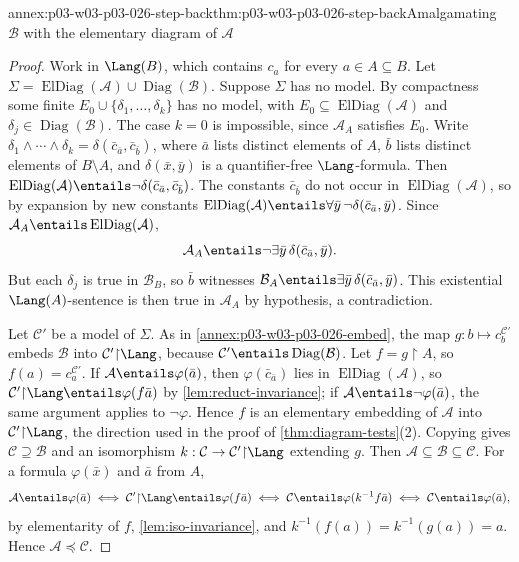 \begin{annexitem}{annex:p03-w03-p03-026-step-back}{thm:p03-w03-p03-026-step-back}{Amalgamating \(\mathcal B\) with the elementary diagram of \(\mathcal A\)}
\begin{proof}
Work in \(\Lang(B)\), which contains \(c_a\) for every \(a\in A\subseteq B\).
Let \(\Sigma=\operatorname{ElDiag}(\mathcal A)\cup\operatorname{Diag}(\mathcal B)\).
Suppose \(\Sigma\) has no model.  By compactness some finite
\(E_0\cup\{\delta_1,\ldots,\delta_k\}\) has no model, with
\(E_0\subseteq\operatorname{ElDiag}(\mathcal A)\) and
\(\delta_j\in\operatorname{Diag}(\mathcal B)\). The case \(k=0\) is
impossible, since \(\mathcal A_A\) satisfies \(E_0\). Write
\(\delta_1\land\cdots\land\delta_k=\delta(\bar c_{\bar a},\bar c_{\bar b})\),
where \(\bar a\) lists distinct elements of \(A\), \(\bar b\) lists distinct
elements of \(B\setminus A\), and \(\delta(\bar x,\bar y)\) is a
quantifier-free \(\Lang\)-formula.
Then \(\operatorname{ElDiag}(\mathcal A)\entails
\neg\delta(\bar c_{\bar a},\bar c_{\bar b})\).  The constants
\(\bar c_{\bar b}\) do not occur in \(\operatorname{ElDiag}(\mathcal A)\), so
by expansion by new constants
\(\operatorname{ElDiag}(\mathcal A)\entails
\forall\bar y\,\neg\delta(\bar c_{\bar a},\bar y)\).  Since
\(\mathcal A_A\entails\operatorname{ElDiag}(\mathcal A)\),
\[
 \mathcal A_A\entails\neg\exists\bar y\,\delta(\bar c_{\bar a},\bar y).
\]
But each \(\delta_j\) is true in \(\mathcal B_B\), so \(\bar b\) witnesses
\(\mathcal B_A\entails\exists\bar y\,\delta(\bar c_{\bar a},\bar y)\).  This
existential \(\Lang(A)\)-sentence is then true in \(\mathcal A_A\) by
hypothesis, a contradiction.

Let \(\mathcal C'\) be a model of \(\Sigma\).  As in \cref{annex:p03-w03-p03-026-embed}, the map
\(g:b\mapsto c_b^{\mathcal C'}\) embeds \(\mathcal B\) into
\(\mathcal C'{\restriction}\Lang\), because
\(\mathcal C'\entails\operatorname{Diag}(\mathcal B)\).  Let
\(f=g{\restriction}A\), so \(f(a)=c_a^{\mathcal C'}\).  If
\(\mathcal A\entails\varphi(\bar a)\), then \(\varphi(\bar c_{\bar a})\) lies
in \(\operatorname{ElDiag}(\mathcal A)\), so
\(\mathcal C'{\restriction}\Lang\entails\varphi(f\bar a)\) by
\cref{lem:reduct-invariance}; if \(\mathcal A\entails\neg\varphi(\bar a)\),
the same argument applies to \(\neg\varphi\).  Hence \(f\) is an elementary
embedding of \(\mathcal A\) into \(\mathcal C'{\restriction}\Lang\), the
direction used in the proof of \cref{thm:diagram-tests}(2).  Copying gives \(\mathcal C\supseteq\mathcal B\) and
an isomorphism \(k:\mathcal C\to\mathcal C'{\restriction}\Lang\) extending
\(g\).  Then \(\mathcal A\subseteq\mathcal B\subseteq\mathcal C\).  For a
formula \(\varphi(\bar x)\) and \(\bar a\) from \(A\),
\[
 \mathcal A\entails\varphi(\bar a)
 \iff\mathcal C'{\restriction}\Lang\entails\varphi(f\bar a)
 \iff\mathcal C\entails\varphi(k^{-1}f\bar a)
 \iff\mathcal C\entails\varphi(\bar a),
\]
by elementarity of \(f\), \cref{lem:iso-invariance}, and
\(k^{-1}(f(a))=k^{-1}(g(a))=a\).  Hence \(\mathcal A\preccurlyeq\mathcal C\).
\end{proof}
\end{annexitem}


